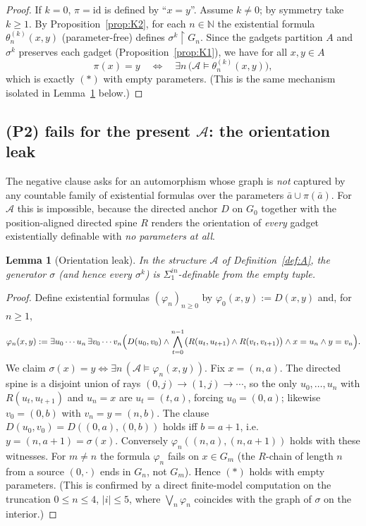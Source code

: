 \documentclass[12pt,fullpage]{article}
\newtheorem{lemma}[theorem]{Lemma}
\theoremstyle{definition}
\newcommand{\A}{\mathcal{A}}
\newcommand{\N}{\mathbb{N}}
\renewcommand{\phi}{\varphi}
\begin{document}
\begin{proof}
If $k=0$, $\pi=\mathrm{id}$ is defined by ``$x=y$''.  Assume $k\neq0$; by
symmetry take $k\ge1$.  By Proposition~\ref{prop:K2}, for each $n\in\N$ the
existential formula $\theta_n^{(k)}(x,y)$ (parameter-free) defines
$\sigma^k\restriction G_n$.  Since the gadgets partition $A$ and
$\sigma^k$ preserves each gadget (Proposition~\ref{prop:K1}), we have for all
$x,y\in A$
\[
\pi(x)=y\quad\Longleftrightarrow\quad \exists n\,\bigl(\A\models\theta_n^{(k)}(x,y)\bigr),
\]
which is exactly $(\ast)$ with empty parameters.  (This is the same mechanism
isolated in Lemma~\ref{lem:leak} below.)
\end{proof}


\subsection*{(P2) fails for the present $\A$: the orientation leak}

The negative clause asks for an automorphism whose graph is \emph{not}
captured by any countable family of existential formulas over the parameters
$\bar a\cup\pi(\bar a)$.  For $\A$ this is impossible, because the directed
anchor $D$ on $G_0$ together with the position-aligned directed spine $R$
renders the orientation of \emph{every} gadget existentially definable with
\emph{no parameters at all}.

\begin{lemma}[Orientation leak]\label{lem:leak}
In the structure $\A$ of Definition~\ref{def:A}, the generator $\sigma$ (and
hence every $\sigma^k$) is $\Sigma^{in}_1$-definable from the \emph{empty}
tuple.
\end{lemma}

\begin{proof}
Define existential formulas $(\phi_n)_{n\ge0}$ by $\phi_0(x,y):=D(x,y)$ and,
for $n\ge1$,
\[
\phi_n(x,y):=\exists u_0\cdots u_n\,\exists v_0\cdots v_n\Bigl(
D(u_0,v_0)\wedge\bigwedge_{t=0}^{n-1}\bigl(R(u_t,u_{t+1})\wedge R(v_t,v_{t+1})\bigr)
\wedge x=u_n\wedge y=v_n\Bigr).
\]
We claim $\sigma(x)=y\iff\exists n\,(\A\models\phi_n(x,y))$.  Fix $x=(n,a)$.
The directed spine is a disjoint union of rays $(0,j)\to(1,j)\to\cdots$, so the
only $u_0,\dots,u_n$ with $R(u_t,u_{t+1})$ and $u_n=x$ are
$u_t=(t,a)$, forcing $u_0=(0,a)$; likewise $v_0=(0,b)$ with $v_n=y=(n,b)$.
The clause $D(u_0,v_0)=D((0,a),(0,b))$ holds iff $b=a+1$, i.e.\ $y=(n,a+1)=
\sigma(x)$.  Conversely $\phi_n((n,a),(n,a+1))$ holds with these witnesses.
For $m\neq n$ the formula $\phi_n$ fails on $x\in G_m$ (the $R$-chain of length
$n$ from a source $(0,\cdot)$ ends in $G_n$, not $G_m$).  Hence $(\ast)$ holds
with empty parameters.  (This is confirmed by a direct finite-model
computation on the truncation $0\le n\le4$, $|i|\le5$, where
$\bigvee_n\phi_n$ coincides with the graph of $\sigma$ on the interior.)
\end{proof}
\end{document}
